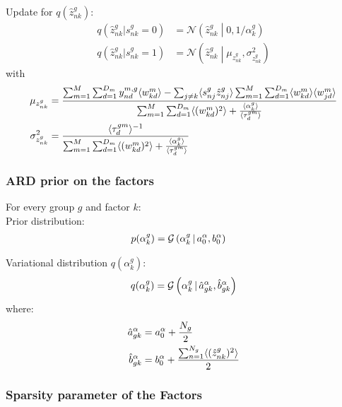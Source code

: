 Update for $q(\hat{z}_{nk}^g)$:
\begin{equation} \begin{aligned}
      q(\hat{z}_{nk}^g|s_{nk}^g=0) &= \mathcal{N} \left(\hat{z}_{nk}^g \middle| 0, 1/\alpha_k^g \right) \\
      q(\hat{z}_{nk}^g|s_{nk}^g=1) &= \mathcal{N} \left( \hat{z}_{nk}^g \middle| \mu_{z_{nk}^g}, \sigma_{z_{nk}^g}^2\right)
  \end{aligned} \end{equation}
with
\begin{equation} \begin{aligned}
  	\mu_{z_{nk}^g} &= \frac{ \sum_{m=1}^M\sum_{d=1}^{D_m} y_{nd}^{m,g} \langle w^m_{kd} \rangle - \sum_{j \neq k} \langle s_{nj}^g\hat{z}_{nj}^g \rangle \sum_{m=1}^M\sum_{d=1}^{D_m} \langle w^m_{kd} \rangle \langle w^m_{jd} \rangle } { \sum_{m=1}^M\sum_{d=1}^{D_m} \langle (w_{kd}^m)^2 \rangle + \frac{\langle\alpha_k^g\rangle}{\langle\tau_d^{gm}\rangle} }\\
  	\sigma_{z_{nk}^g}^2 &= \frac{ \langle\tau_d^{gm}\rangle^{-1} } { \sum_{m=1}^M\sum_{d=1}^{D_m} \langle (w_{kd}^m)^2 \rangle + \frac{\langle\alpha_k^g\rangle}{\langle\tau_d^{gm}\rangle} }
\end{aligned} \end{equation}


\subsubsection*{ARD prior on the factors}

For every group $g$ and factor $k$: \\

Prior distribution:
\begin{align}
	p(\alpha_k^g) &= \mathcal{G}\left(\alpha_k^g \,|\, a_0^\alpha, b_0^\alpha\right)
\end{align}

Variational distribution $q(\alpha_k^g)$:
\begin{equation}
    q(\alpha^g_{k}) = \mathcal{G}\left(\alpha_k^g \,|\, \hat{a}_{gk}^{\alpha}, \hat{b}_{gk}^{\alpha}\right)
\end{equation}
where:
\begin{equation} \begin{aligned}
	\hat{a}_{gk}^\alpha &= a_0^\alpha + \frac{N_g}{2}\\
	\hat{b}_{gk}^\alpha &= b_0^\alpha +\frac{ \sum_{n=1}^{N_g} \langle (\hat{z}_{nk}^g)^2 \rangle }{2}
\end{aligned} \end{equation}

\subsubsection*{Sparsity parameter of the Factors}

